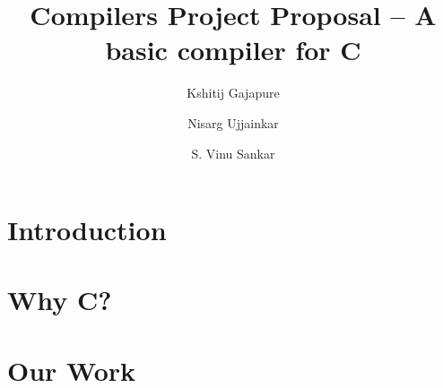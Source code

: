 \documentclass{clv3}
\author{Kshitij Gajapure}
\affil{16110055}
\author{Nisarg Ujjainkar}
\affil{16110102}
\author{S. Vinu Sankar}
\affil{16110143}
\title{Compilers Project Proposal -- A basic compiler for C}
\begin{document}
    \maketitle  
    \section{Introduction}
    
    \section{Why C?}
    
    \section{Our Work}
    
\end{document}
